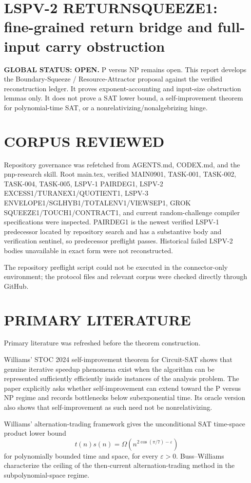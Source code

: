 \documentclass[11pt]{article}
\begin{document}
\section*{LSPV-2 RETURNSQUEEZE1: fine-grained return bridge and full-input carry obstruction}

\textbf{GLOBAL STATUS: OPEN.} P versus NP remains open. This report develops the Boundary-Squeeze / Resource-Attractor proposal against the verified reconstruction ledger. It proves exponent-accounting and input-size obstruction lemmas only. It does not prove a SAT lower bound, a self-improvement theorem for polynomial-time SAT, or a nonrelativizing/nonalgebrizing hinge.

\section*{CORPUS REVIEWED}
Repository governance was refetched from AGENTS.md, CODEX.md, and the pnp-research skill. Root main.tex, verified MAIN0901, TASK-001, TASK-002, TASK-004, TASK-005, LSPV-1 PAIRDEG1, LSPV-2 EXCESS1/TURANEX1/QUOTIENT1, LSPV-3 ENVELOPE1/SGLHYB1/TOTALENV1/VIEWSEP1, GROK SQUEEZE1/TOUCH1/CONTRACT1, and current random-challenge compiler specifications were inspected. PAIRDEG1 is the newest verified LSPV-1 predecessor located by repository search and has a substantive body and verification sentinel, so predecessor preflight passes. Historical failed LSPV-2 bodies unavailable in exact form were not reconstructed.

The repository preflight script could not be executed in the connector-only environment; the protocol files and relevant corpus were checked directly through GitHub.

\section*{PRIMARY LITERATURE}
Primary literature was refreshed before the theorem construction.

Williams' STOC 2024 self-improvement theorem for Circuit-SAT shows that genuine iterative speedup phenomena exist when the algorithm can be represented sufficiently efficiently inside instances of the analysis problem. The paper explicitly asks whether self-improvement can extend toward the P versus NP regime and records bottlenecks below subexponential time. Its oracle version also shows that self-improvement as such need not be nonrelativizing.

Williams' alternation-trading framework gives the unconditional SAT time-space product lower bound
\[
t(n)s(n)=\Omega\!\left(n^{2\cos(\pi/7)-\varepsilon}\right)
\]
for polynomially bounded time and space, for every \(\varepsilon>0\). Buss--Williams characterize the ceiling of the then-current alternation-trading method in the subpolynomial-space regime.
\end{document}
